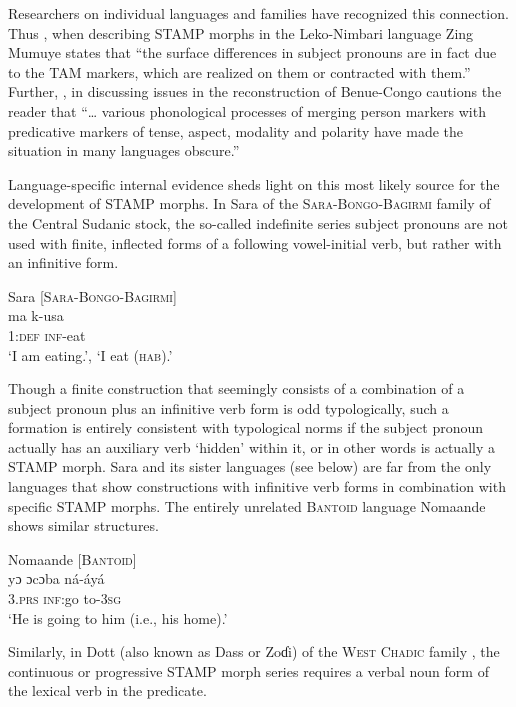 \documentclass[output=paper]{langsci/langscibook}
\begin{document}
Researchers on individual languages and families have recognized this connection. Thus \citet[101]{Shimizu1983}, when describing STAMP morphs in the Leko-Nimbari language Zing Mumuye states that ``the surface differences in subject pronouns are in fact due to the TAM markers, which are realized on them or contracted with them.'' Further, \citet[35]{Babaev2010}, in discussing issues in the reconstruction of Benue-Congo cautions the reader that ``… various phonological processes of merging person markers with predicative markers of tense, aspect, modality and polarity have made the situation in many languages obscure.''

  Language-specific internal evidence sheds light on this most likely source for the development of STAMP morphs. In Sara of the \textsc{Sara-Bongo-Bagirmi} family of the Central Sudanic stock, the so-called indefinite series subject pronouns are not used with finite, inflected forms of a following vowel-initial verb, but rather with an infinitive form.
  
  \ea\label{ex:anderson:34}
  Sara \citep[75]{TuckerBryan1966}      [\textsc{Sara-Bongo-Bagirmi}]\\
\gll ma    k-usa\\
1:\textsc{def}  \textsc{inf}-eat\\
\glt `I am eating.', `I eat (\textsc{hab}).' 
\z

Though a finite construction that seemingly consists of a combination of a subject pronoun  plus an infinitive verb form is odd typologically, such a formation is entirely consistent with typological norms if the subject pronoun actually has an auxiliary verb `hidden' within it, or in other words is actually a STAMP morph. Sara and its sister languages (see  below) are far from the only languages that show constructions with infinitive verb forms in combination with specific STAMP morphs. The entirely unrelated \textsc{Bantoid} language Nomaande shows similar structures. 

\ea\label{ex:anderson:35}
Nomaande \citep[22]{Wilkendorf2001}          \textsc{[Bantoid]}\\
\gll yɔ    ɔcɔba  ná-áyá\\
3.\textsc{prs}  \textsc{inf}:go  to-\textsc{3sg}\\
\glt `He is going to him (i.e., his home).' 
\z

Similarly, in Dott (also known as Dass or Zoɗi) of the \textsc{West Chadic} family , the continuous or progressive STAMP morph series requires a verbal noun form of the lexical verb in the predicate. 
\end{document}
